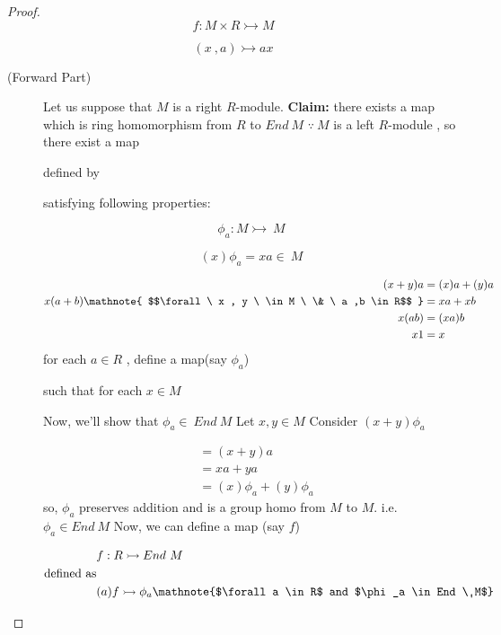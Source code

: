 \begin{proof}

\[
f: M \times R \rightarrowtail M  
\]

\[
(x \ , a) \rightarrowtail ax 
\]

\begin{description}
	\item[(Forward Part)\newline]
	Let us suppose that $ M $ is a right $ R $-module.\newline
	\textbf{Claim:} there exists a map which is ring homomorphism from $R$ to $End \ M$\newline
   $ \because \ M  $ is a left $ R $-module , so there exist a map\newline
   
   defined by
   
   satisfying following properties:

\[
\phi_a: M\rightarrowtail\ M 
\]

\[
(x )\phi_a = xa \in \ M 
\]

\begin{align*}
 (x+y)a &= (x)a+(y)a \\
     x(a+b)\mathnote{ $$\forall \ x , y \ \in M \ \&  \ a ,b \in R$$ } &= xa + xb \\
     x(ab) &= (xa)b \\
     x 1 &= x
     
\end{align*}
   for each $ a \in R $ , define a map(say $\phi_a $)
   
   such that for each $x\in  M$
   
   Now, we'll show that $ \phi_a \in \ End \ M $\newline
   Let $ x , y \in M $ \newline Consider  $  (x+y)\phi_a$

\begin{align*}
   	&= (x+y)a  \\ &= xa + ya  \\ &= (x)\phi_a + (y)\phi_a
   \end{align*}
 
   so, $\phi_a$ preserves addition and is a group homo from $M$ to $M$.
   \newline i.e. $\phi_a \in End \ M$ \newline
   Now, we can define a map (say $f$)

\begin{align*}
   &f : R \rightarrowtail End \ M \\ \text{defined as} \\&(a)f \rightarrowtail \phi_a \mathnote{$\forall a \in R$ and $\phi_a \in End \ M$}
   

\end{align*}
\end{description}
\end{proof}
